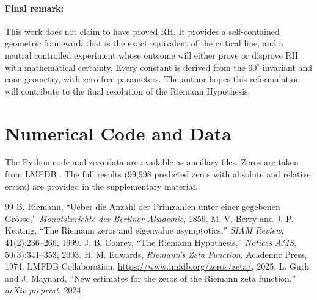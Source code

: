 \documentclass[12pt,a4paper]{article}
\begin{document}
\paragraph{Final remark:}
This work does not claim to have proved RH. It provides a self-contained geometric framework that is the exact equivalent of the critical line, and a neutral controlled experiment whose outcome will either prove or disprove RH with mathematical certainty. Every constant is derived from the $60^\circ$ invariant and cone geometry, with zero free parameters. The author hopes this reformulation will contribute to the final resolution of the Riemann Hypothesis.

\appendix
\section{Numerical Code and Data}

The Python code and zero data are available as ancillary files. Zeros are taken from LMFDB \cite{lmfdb}. The full results (99,998 predicted zeros with absolute and relative errors) are provided in the supplementary material.

\begin{thebibliography}{99}
 B. Riemann, ``Ueber die Anzahl der Primzahlen unter einer gegebenen Grösse,'' \textit{Monatsberichte der Berliner Akademie}, 1859.
 M. V. Berry and J. P. Keating, ``The Riemann zeros and eigenvalue asymptotics,'' \textit{SIAM Review}, 41(2):236--266, 1999.
 J. B. Conrey, ``The Riemann Hypothesis,'' \textit{Notices AMS}, 50(3):341--353, 2003.
 H. M. Edwards, \textit{Riemann's Zeta Function}, Academic Press, 1974.
 LMFDB Collaboration, \url{https://www.lmfdb.org/zeros/zeta/}, 2025.
 L. Guth and J. Maynard, ``New estimates for the zeros of the Riemann zeta function,'' \textit{arXiv preprint}, 2024.
\end{thebibliography}
\end{document}
